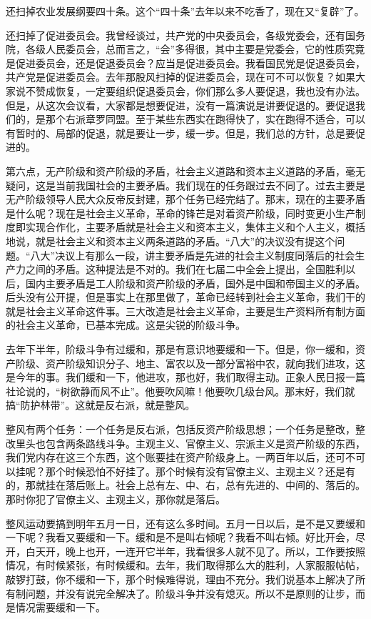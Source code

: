 还扫掉农业发展纲要四十条。这个“四十条”去年以来不吃香了，现在又“复辟”了。

还扫掉了促进委员会。我曾经谈过，共产党的中央委员会，各级党委会，还有国务院，各级人民委员会，总而言之，“会”多得很，其中主要是党委会，它的性质究竟是促进委员会，还是促退委员会？应当是促进委员会。我看国民党是促退委员会，共产党是促进委员会。去年那股风扫掉的促进委员会，现在可不可以恢复？如果大家说不赞成恢复，一定要组织促退委员会，你们那么多人要促退，我也没有办法。但是，从这次会议看，大家都是想要促进，没有一篇演说是讲要促退的。要促退我们的，是那个右派章罗同盟。至于某些东西实在跑得快了，实在跑得不适合，可以有暂时的、局部的促退，就是要让一步，缓一步。但是，我们总的方针，总是要促进的。

第六点，无产阶级和资产阶级的矛盾，社会主义道路和资本主义道路的矛盾，毫无疑问，这是当前我国社会的主要矛盾。我们现在的任务跟过去不同了。过去主要是无产阶级领导人民大众反帝反封建，那个任务已经完结了。那末，现在的主要矛盾是什么呢？现在是社会主义革命，革命的锋芒是对着资产阶级，同时变更小生产制度即实现合作化，主要矛盾就是社会主义和资本主义，集体主义和个人主义，概括地说，就是社会主义和资本主义两条道路的矛盾。“八大”的决议没有提这个问题。“八大”决议上有那么一段，讲主要矛盾是先进的社会主义制度同落后的社会生产力之间的矛盾。这种提法是不对的。我们在七届二中全会上提出，全国胜利以后，国内主要矛盾是工人阶级和资产阶级的矛盾，国外是中国和帝国主义的矛盾。后头没有公开提，但是事实上在那里做了，革命已经转到社会主义革命，我们干的就是社会主义革命这件事。三大改造是社会主义革命，主要是生产资料所有制方面的社会主义革命，已基本完成。这是尖锐的阶级斗争。

去年下半年，阶级斗争有过缓和，那是有意识地要缓和一下。但是，你一缓和，资产阶级、资产阶级知识分子、地主、富农以及一部分富裕中农，就向我们进攻，这是今年的事。我们缓和一下，他进攻，那也好，我们取得主动。正象人民日报一篇社论说的，“树欲静而风不止”。他要吹风嘛！他要吹几级台风。那末好，我们就搞“防护林带”。这就是反右派，就是整风。

整风有两个任务：一个任务是反右派，包括反资产阶级思想；一个任务是整改，整改里头也包含两条路线斗争。主观主义、官僚主义、宗派主义是资产阶级的东西，我们党内存在这三个东西，这个账要挂在资产阶级身上。一两百年以后，还可不可以挂呢？那个时候恐怕不好挂了。那个时候有没有官僚主义、主观主义？还是有的，那就挂在落后账上。社会上总有左、中、右，总有先进的、中间的、落后的。那时你犯了官僚主义、主观主义，那你就是落后。

整风运动要搞到明年五月一日，还有这么多时间。五月一日以后，是不是又要缓和一下呢？我看又要缓和一下。缓和是不是叫右倾呢？我看不叫右倾。好比开会，尽开，白天开，晚上也开，一连开它半年，我看很多人就不见了。所以，工作要按照情况，有时候紧张，有时候缓和。去年，我们取得那么大的胜利，人家服服帖帖，敲锣打鼓，你不缓和一下，那个时候难得说，理由不充分。我们说基本上解决了所有制问题，并没有说完全解决了。阶级斗争并没有熄灭。所以不是原则的让步，而是情况需要缓和一下。

